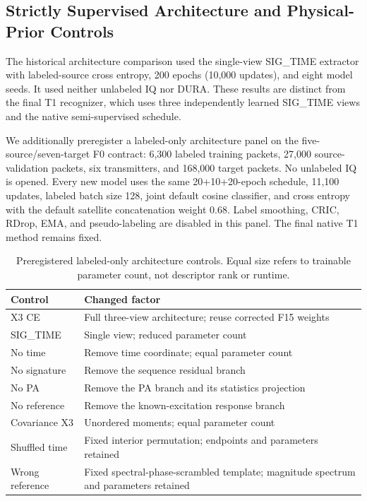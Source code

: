 \subsection{Strictly Supervised Architecture and Physical-Prior Controls}
The historical architecture comparison used the single-view SIG\_TIME
extractor with labeled-source cross entropy, 200 epochs (10,000 updates),
and eight model seeds. It used neither unlabeled IQ nor DURA. These results
are distinct from the final T1 recognizer, which uses three independently
learned SIG\_TIME views and the native semi-supervised schedule.

We additionally preregister a labeled-only architecture panel on the
five-source/seven-target F0 contract: 6,300 labeled training packets,
27,000 source-validation packets, six transmitters, and 168,000 target
packets. No unlabeled IQ is opened. Every new model uses the same
20+10+20-epoch schedule, 11,100 updates, labeled batch size 128, joint
default cosine classifier, and cross entropy with the default satellite
concatenation weight 0.68. Label smoothing, CRIC, RDrop, EMA, and
pseudo-labeling are disabled in this panel. The final native T1 method
remains fixed.

\begin{table}[t]
\centering\small
\caption{Preregistered labeled-only architecture controls. Equal size
refers to trainable parameter count, not descriptor rank or runtime.}
\label{tab:pamf_sup_physics_design}
\begin{tabular}{p{}p{}}
\hline
Control & Changed factor \\\hline
X3 CE & Full three-view architecture; reuse corrected F15 weights \\
SIG\_TIME & Single view; reduced parameter count \\
No time & Remove time coordinate; equal parameter count \\
No signature & Remove the sequence residual branch \\
No PA & Remove the PA branch and its statistics projection \\
No reference & Remove the known-excitation response branch \\
Covariance X3 & Unordered moments; equal parameter count \\
Shuffled time & Fixed interior permutation; endpoints and parameters retained \\
Wrong reference & Fixed spectral-phase-scrambled template; magnitude spectrum and parameters retained \\\hline
\end{tabular}
\end{table}

